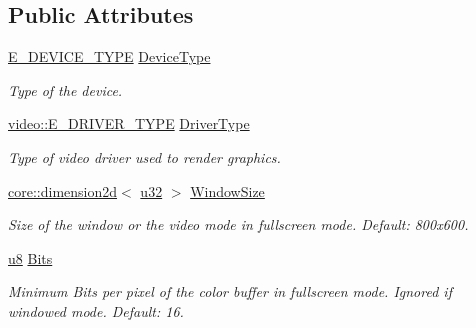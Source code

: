 \subsection*{Public Attributes}
\begin{DoxyCompactItemize}
\item 
\hyperlink{namespaceirr_ac25d94cf2e1037c7ca18ee79b3bd4505}{E\+\_\+\+D\+E\+V\+I\+C\+E\+\_\+\+T\+Y\+PE} \hyperlink{structirr_1_1SIrrlichtCreationParameters_a76520addbdf96ee3b3f00cb7f55076e5}{Device\+Type}
\begin{DoxyCompactList}\small\item\em Type of the device. \end{DoxyCompactList}\item 
\hyperlink{namespaceirr_1_1video_ae35a6de6d436c76107ad157fe42356d0}{video\+::\+E\+\_\+\+D\+R\+I\+V\+E\+R\+\_\+\+T\+Y\+PE} \hyperlink{structirr_1_1SIrrlichtCreationParameters_a1ea2f50c3b3a8eed6602a1a86e1cdf82}{Driver\+Type}
\begin{DoxyCompactList}\small\item\em Type of video driver used to render graphics. \end{DoxyCompactList}\item 
\mbox{\label{structirr_1_1SIrrlichtCreationParameters_a1b596e201a6ebd63ca2841d46be10433}} 
\hyperlink{classirr_1_1core_1_1dimension2d}{core\+::dimension2d}$<$ \hyperlink{namespaceirr_a0416a53257075833e7002efd0a18e804}{u32} $>$ \hyperlink{structirr_1_1SIrrlichtCreationParameters_a1b596e201a6ebd63ca2841d46be10433}{Window\+Size}
\begin{DoxyCompactList}\small\item\em Size of the window or the video mode in fullscreen mode. Default\+: 800x600. \end{DoxyCompactList}\item 
\mbox{\label{structirr_1_1SIrrlichtCreationParameters_a0f7480557670df2d954ae217732a8773}} 
\hyperlink{namespaceirr_a646874f69af8ff87fc10201b0254a761}{u8} \hyperlink{structirr_1_1SIrrlichtCreationParameters_a0f7480557670df2d954ae217732a8773}{Bits}
\begin{DoxyCompactList}\small\item\em Minimum Bits per pixel of the color buffer in fullscreen mode. Ignored if windowed mode. Default\+: 16. \end{DoxyCompactList}\item 

\end{DoxyCompactItemize}
